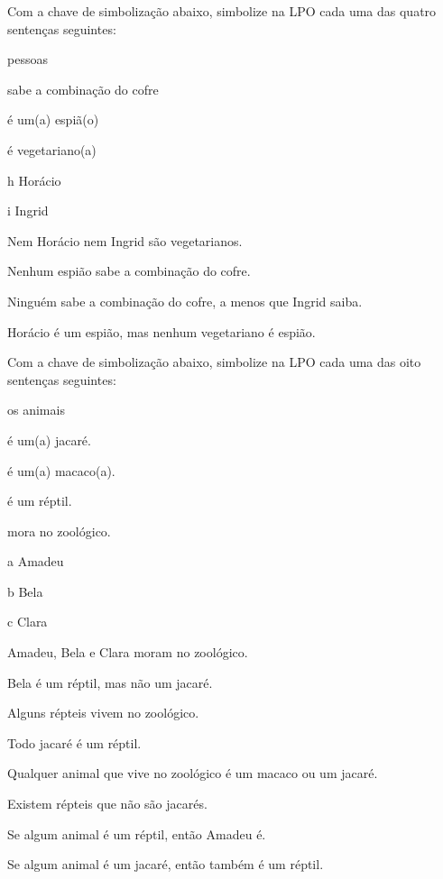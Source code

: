 \problempart
\label{pr.FOLvegetarians}
Com a chave de simbolização abaixo, simbolize na LPO cada uma das quatro sentenças seguintes:
\begin{center}
\begin{ekey}
\item[\text{domínio}] pessoas
\item[\atom{C}{x}]  sabe a combinação do cofre
\item[\atom{E}{x}]  é um(a) espiã(o)
\item[\atom{V}{x}]  é vegetariano(a)
\item[h] Horácio
\item[i] Ingrid
\end{ekey}
\end{center}
\begin{earg}
\item Nem Horácio nem Ingrid são vegetarianos.
\item Nenhum espião sabe a combinação do cofre.
\item Ninguém sabe a combinação do cofre, a menos que Ingrid saiba.
\item Horácio é um espião, mas nenhum vegetariano é espião.
\end{earg}
\solutions

\problempart\label{pr.FOLalligators}
Com a chave de simbolização abaixo, simbolize na LPO cada uma das oito sentenças seguintes:
\begin{center}
\begin{ekey}
\item[\text{domínio}] os animais
\item[\atom{J}{x}]  é um(a) jacaré.
\item[\atom{M}{x}]  é um(a) macaco(a).
\item[\atom{R}{x}]  é um réptil.
\item[\atom{Z}{x}]  mora no zoológico.
\item[a] Amadeu
\item[b] Bela
\item[c] Clara
\end{ekey}
\end{center}
\begin{earg}
\item Amadeu, Bela e Clara moram no zoológico.
\item Bela é um réptil, mas não um jacaré.
\item Alguns répteis vivem no zoológico.
\item Todo jacaré é um réptil.
\item Qualquer animal que vive no zoológico é um macaco ou um jacaré.
\item Existem répteis que não são jacarés.
\item Se algum animal é um réptil, então Amadeu é.
\item Se algum animal é um jacaré, então também é um réptil.\end{earg}

